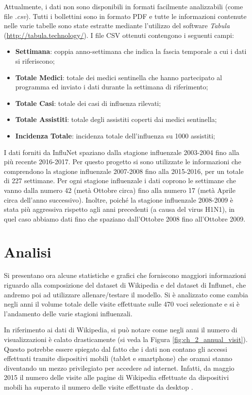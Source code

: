 Attualmente, i dati non sono disponibili in formati facilmente analizzabili (come file \textit{.csv}). Tutti i bollettini
sono in formato PDF e tutte le informazioni contenute nelle varie tabelle sono state estratte mediante l'utilizzo del software \textit{Tabula} (\url{http://tabula.technology/}). I file CSV ottenuti contengono i seguenti campi:
\begin{itemize}[noitemsep]
\item \textbf{Settimana}: coppia anno-settimana che indica la fascia temporale a cui i dati si riferiscono;
\item \textbf{Totale Medici}: totale dei medici sentinella che hanno partecipato al programma ed inviato i dati durante la settimana di riferimento; 
\item \textbf{Totale Casi}: totale dei casi di influenza rilevati;
\item \textbf{Totale Assistiti}: totale degli assistiti coperti dai medici sentinella;
\item \textbf{Incidenza Totale}: incidenza totale dell'influenza su 1000 assistiti;
\end{itemize}
\bigskip

I dati forniti da InfluNet spaziano dalla stagione influenzale 2003-2004 fino alla più recente 2016-2017. Per questo progetto 
si sono utilizzate le informazioni che comprendono la stagione influenzale 2007-2008 fino alla 2015-2016, per un totale di 
227 settimane. Per ogni stagione influenzale i dati coprono le settimane che vanno dalla numero 42 (metà Ottobre circa) fino 
alla numero 17 (metà Aprile circa dell'anno successivo). Inoltre, poiché la stagione influenzale 2008-2009 è stata più 
aggressiva rispetto agli anni precedenti (a causa del virus H1N1), in quel caso abbiamo dati fino che spaziano dall'Ottobre 
2008 fino all'Ottobre 2009.

\section{Analisi}
\bigskip

Si presentano ora alcune statistiche e grafici che forniscono maggiori informazioni riguardo alla composizione del dataset di 
Wikipedia e del dataset di Influnet, che andremo poi ad utilizzare allenare/testare il modello. Si è analizzato come 
cambia negli anni il volume totale delle visite effettuate sulle 470 voci selezionate e si è 
l'andamento delle varie stagioni influenzali.
\bigskip

In riferimento ai dati di Wikipedia, si può notare come negli anni il numero di visualizzazioni è calato drasticamente (si 
veda la Figura \ref{fig:ch_2_annual_visit}). Questo potrebbe essere spiegato dal fatto che i dati non contano gli accessi 
effettuati tramite dispositivi mobili (tablet e smartphone) che oramai stanno diventando un mezzo privilegiato per accedere 
ad internet. Infatti, da maggio 2015 il numero delle visite alle pagine di Wikipedia effettuate da dispositivi mobili ha 
superato il numero delle visite effettuate da desktop \cite{wikipedia_mobile_desktop}.
\bigskip

